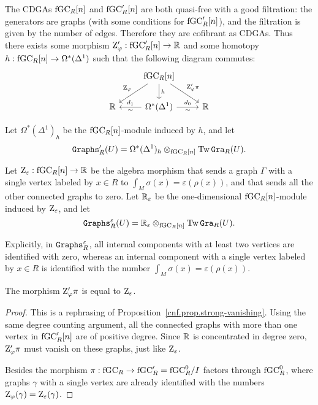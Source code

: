 The CDGAs $\mathrm{fGC}_{R}[n]$ and $\mathrm{fGC}'_{R}[n]$ are both quasi-free with a good filtration: the generators are graphs (with some conditions for $\mathrm{fGC}'_{R}[n]$), and the filtration is given by the number of edges.
Therefore they are cofibrant as CDGAs.
Thus there exists some morphism $\mathrm{Z}_{\varphi}' : \mathrm{fGC}'_{R}[n] \to \mathbb{R}$ and some homotopy $h : \mathrm{fGC}_{R}[n] \to \Omega^{*}(\Delta^{1})$ such that the following diagram commutes:
\[ \begin{tikzcd}
    {} & \fGC_{R}[n] \dlar[swap]{\Zphi} \drar{\Zphi' \pi} \dar{h} \\
    \R & \Omega^{*}(\Delta^{1}) \lar{\sim}[swap]{d_{1}} \rar{d_{0}}[swap]{\sim} & \R
  \end{tikzcd} \]

\begin{definition}
  Let $\Omega^{*}(\Delta^{1})_{h}$ be the $\mathrm{fGC}_{R}[n]$-module induced by $h$, and let
  \[ \mathtt{Graphs}'_{R}(U) = \Omega^{*}(\Delta^{1})_{h} \otimes_{\mathrm{fGC}_{R}[n]} \operatorname{Tw} \mathtt{Gra}_{R}(U). \]
\end{definition}

\begin{definition}
  Let $\mathrm{Z}_{\varepsilon} : \mathrm{fGC}_{R}[n] \to \mathbb{R}$ be the algebra morphism that sends a graph $\Gamma$ with a single vertex labeled by $x \in R$ to $\int_{M} \sigma(x) = \varepsilon(\rho(x))$, and that sends all the other connected graphs to zero.
  Let $\mathbb{R}_{\varepsilon}$ be the one-dimensional $\mathrm{fGC}_{R}[n]$-module induced by $\mathrm{Z}_{\varepsilon}$, and let
  \[ \mathtt{Graphs}^{\varepsilon}_{R}(U) = \mathbb{R}_{\varepsilon} \otimes_{\mathrm{fGC}_{R}[n]} \operatorname{Tw} \mathtt{Gra}_{R}(U). \]
\end{definition}

Explicitly, in $\mathtt{Graphs}^{\varepsilon}_{R}$, all internal components with at least two vertices are identified with zero, whereas an internal component with a single vertex labeled by $x \in R$ is identified with the number $\int_{M} \sigma(x) = \varepsilon(\rho(x))$.

\begin{lemma}
  The morphism $\mathrm{Z}_{\varphi}' \pi$ is equal to $\mathrm{Z}_{\varepsilon}$.
\end{lemma}

\begin{proof}
  This is a rephrasing of Proposition~\ref{cnf.prop.strong-vanishing}.
  Using the same degree counting argument, all the connected graphs with more than one vertex in $\mathrm{fGC}'_{R}[n]$ are of positive degree.
  Since $\mathbb{R}$ is concentrated in degree zero, $\mathrm{Z}_{\varphi}' \pi$ must vanish on these graphs, just like $\mathrm{Z}_{\varepsilon}$.

  Besides the morphism $\pi : \mathrm{fGC}_{R} \to \mathrm{fGC}'_{R} = \mathrm{fGC}^{0}_{R} / I$ factors through $\mathrm{fGC}^{0}_{R}$, where graphs $\gamma$ with a single vertex are already identified with the numbers $\mathrm{Z}_{\varphi}(\gamma) = \mathrm{Z}_{\varepsilon}(\gamma)$.
\end{proof}


